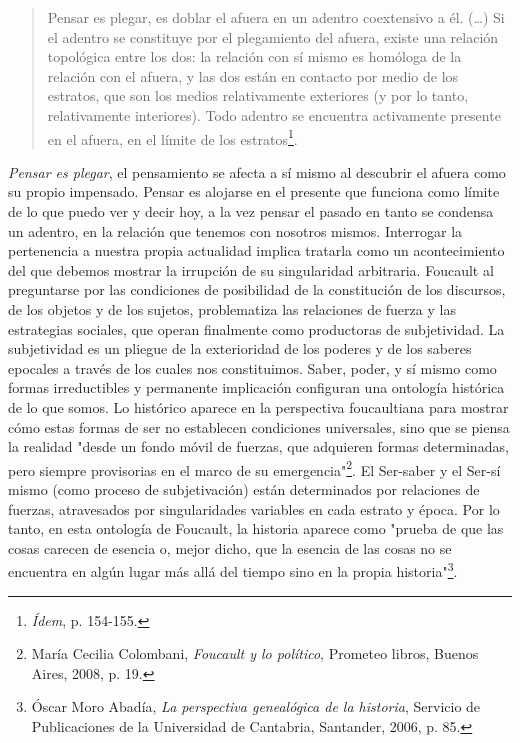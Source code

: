 \documentclass{book}
\begin{document}
\begin{quote}
Pensar es plegar, es doblar el afuera en un adentro coextensivo a él.
(\dots) Si el adentro se constituye por el plegamiento del afuera,
existe una relación topológica entre los dos: la relación con sí mismo
es homóloga de la relación con el afuera, y las dos están en contacto
por medio de los estratos, que son los medios relativamente exteriores
(y por lo tanto, relativamente interiores). Todo adentro se encuentra
activamente presente en el afuera, en el límite de los
estratos\footnote{\emph{Ídem}, p. 154-155.}.
\end{quote}

\emph{Pensar es plegar}, el pensamiento se afecta a sí mismo al
descubrir el afuera como su propio impensado. Pensar es alojarse en el
presente que funciona como límite de lo que puedo ver y decir hoy, a la
vez pensar el pasado en tanto se condensa un adentro, en la relación que
tenemos con nosotros mismos. Interrogar la pertenencia a nuestra propia
actualidad implica tratarla como un acontecimiento del que debemos
mostrar la irrupción de su singularidad arbitraria. Foucault al
preguntarse por las condiciones de posibilidad de la constitución de los
discursos, de los objetos y de los sujetos, problematiza las relaciones
de fuerza y las estrategias sociales, que operan finalmente como
productoras de subjetividad. La subjetividad es un pliegue de la
exterioridad de los poderes y de los saberes epocales a través de los
cuales nos constituimos. Saber, poder, y sí mismo como formas
irreductibles y permanente implicación configuran una ontología
histórica de lo que somos. Lo histórico aparece en la perspectiva
foucaultiana para mostrar cómo estas formas de ser no establecen
condiciones universales, sino que se piensa la realidad "desde un fondo
móvil de fuerzas, que adquieren formas determinadas, pero siempre
provisorias en el marco de su emergencia"\footnote{María Cecilia
  Colombani, \emph{Foucault y lo político}, Prometeo libros, Buenos
  Aires, 2008, p. 19.}. El Ser-saber y el Ser-sí mismo (como proceso de
subjetivación) están determinados por relaciones de fuerzas, atravesados
por singularidades variables en cada estrato y época. Por lo tanto, en
esta ontología de Foucault, la historia aparece como "prueba de que las
cosas carecen de esencia o, mejor dicho, que la esencia de las cosas no
se encuentra en algún lugar más allá del tiempo sino en la propia
historia"\footnote{Óscar Moro Abadía, \emph{La perspectiva genealógica
  de la historia}, Servicio de Publicaciones de la Universidad de
  Cantabria, Santander, 2006, p. 85.}.
\end{document}
